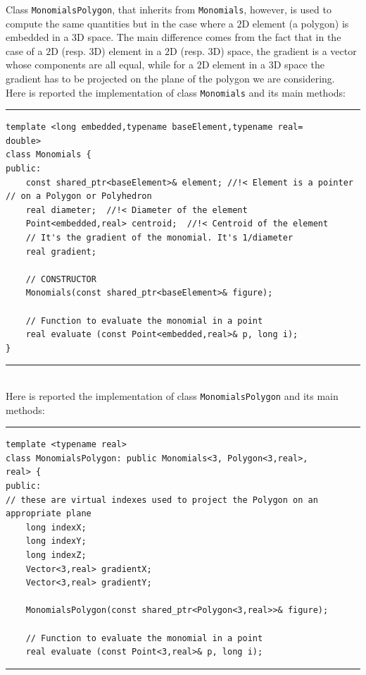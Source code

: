 Class \verb|MonomialsPolygon|, that inherits from  \verb|Monomials|, however, is used to compute the same quantities but in the case where a $2$D element (a polygon) is embedded in a $3$D space. The main difference comes from the fact that in the case of a $2$D (resp. $3$D) element in a $2$D (resp. $3$D) space, the gradient is a vector whose components are all equal, while for a $2$D element in a $3$D space the gradient has to be projected on the plane of the polygon we are considering.\\

Here is reported the implementation of class \verb|Monomials| and its main methods:

\noindent\rule{16cm}{1pt}
\begin{lstlisting}[caption=File \texttt{Monomials.h}]
template <long embedded,typename baseElement,typename real=
double>
class Monomials {
public:
    const shared_ptr<baseElement>& element; //!< Element is a pointer
// on a Polygon or Polyhedron 
    real diameter;  //!< Diameter of the element
    Point<embedded,real> centroid;  //!< Centroid of the element
    // It's the gradient of the monomial. It's 1/diameter
    real gradient;

    // CONSTRUCTOR
    Monomials(const shared_ptr<baseElement>& figure);

    // Function to evaluate the monomial in a point
    real evaluate (const Point<embedded,real>& p, long i);
}
\end{lstlisting}
\noindent\rule{16cm}{1pt}\\

Here is reported the implementation of class \verb|MonomialsPolygon| and its main methods:

\noindent\rule{16cm}{1pt}
\begin{lstlisting}[caption=File \texttt{MonomialsPolygon.h}]
template <typename real>
class MonomialsPolygon: public Monomials<3, Polygon<3,real>,
real> {
public:
// these are virtual indexes used to project the Polygon on an appropriate plane
    long indexX;
    long indexY;
    long indexZ;
    Vector<3,real> gradientX;
    Vector<3,real> gradientY;
	
    MonomialsPolygon(const shared_ptr<Polygon<3,real>>& figure); 
    
    // Function to evaluate the monomial in a point
    real evaluate (const Point<3,real>& p, long i);
\end{lstlisting}

\noindent\rule{16cm}{1pt}\\

